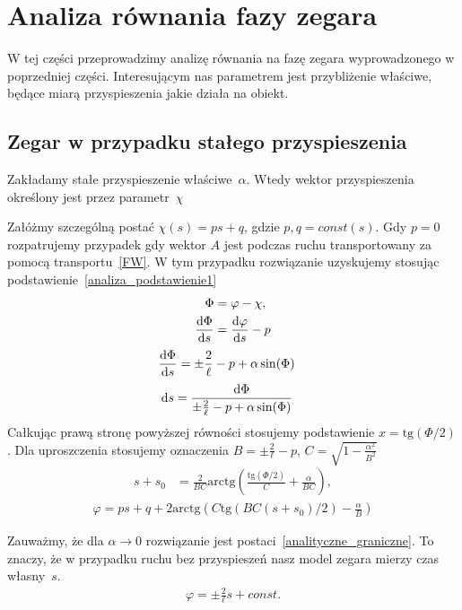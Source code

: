 \newpage
\section{Analiza równania fazy zegara}
W tej części przeprowadzimy analizę równania na fazę zegara
wyprowadzonego w poprzedniej części.
Interesującym nas parametrem jest przybliżenie właściwe, będące miarą 
przyspieszenia jakie działa na obiekt. 

\subsection{Zegar w przypadku stałego przyspieszenia}
Zakładamy stałe przyspieszenie właściwe~$\alpha$. Wtedy wektor 
przyspieszenia określony jest przez parametr~$\chi$

Załóżmy szczególną postać $\chi (s) = p s + q$, 
gdzie $p,q = const(s)$. {\color{red} Gdy $p=0$ 
rozpatrujemy przypadek gdy wektor $A$ jest podczas ruchu
transportowany za pomocą transportu~\eqref{FW}. } 
W tym przypadku rozwiązanie uzyskujemy stosując  
podstawienie~\eqref{analiza_podstawienie1}
\begin{align} \label{analiza_podstawienie1}
\Phi &= \varphi - \chi,\\
\frac{\text{d} \Phi}{\text{d} s} &= \frac{\text{d} \varphi }{\text{d} s} - p
\end{align}
\begin{align*}
\frac{\text{d} \Phi}{\text{d} s} &= \pm \frac{2}{\ell} - p  + 
\alpha \sin (\Phi ) 
\end{align*}
\begin{align*}
\text{d} s & = \frac{\text{d} \Phi}{ \pm \frac{2}{\ell} - p  + 
\alpha \sin (\Phi ) }
\end{align*}
Całkując prawą stronę powyższej równości stosujemy podstawienie
 $ x = \text{tg} (\Phi/2)$. Dla uproszczenia stosujemy oznaczenia
$B = \pm \frac{2}{\ell} - p $,
$C =  \sqrt{ 1 - \frac{\alpha^2}{B^2}}$
\begin{align*}
s +s_0 & = \frac{2}{BC} \text{arctg}  
\left( \frac{ \text{tg} (\Phi/2)}{C} +\frac{\alpha}{BC} \right),
\end{align*}
\begin{align*}
\varphi = ps + q + 
2\text{arctg} \left( 
C \text{tg} \left( BC(s + s_0)/2\right)  - \frac{\alpha}{B}
\right)
\end{align*}

Zauważmy, że dla $\alpha \to 0$ rozwiązanie jest 
postaci~\eqref{analityczne_graniczne}. To znaczy, że w przypadku ruchu
bez przyspieszeń nasz model zegara mierzy czas własny~$s$.
\begin{align}\label{analityczne_graniczne}
\varphi = \pm \frac{2}{\ell} s + const.
\end{align}


